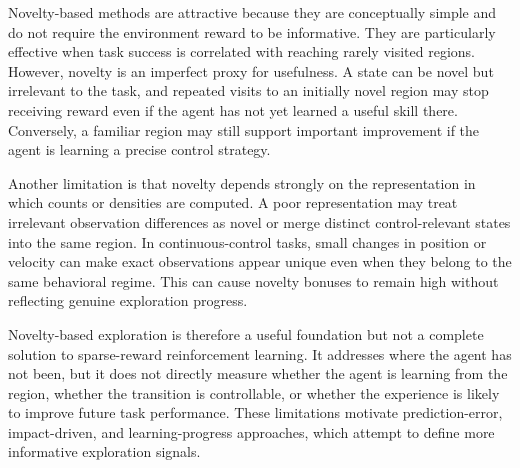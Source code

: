 Novelty-based methods are attractive because they are conceptually simple and do not require the environment reward to be informative.
They are particularly effective when task success is correlated with reaching rarely visited regions.
However, novelty is an imperfect proxy for usefulness.
A state can be novel but irrelevant to the task, and repeated visits to an initially novel region may stop receiving reward even if the agent has not yet learned a useful skill there.
Conversely, a familiar region may still support important improvement if the agent is learning a precise control strategy.

Another limitation is that novelty depends strongly on the representation in which counts or densities are computed.
A poor representation may treat irrelevant observation differences as novel or merge distinct control-relevant states into the same region.
In continuous-control tasks, small changes in position or velocity can make exact observations appear unique even when they belong to the same behavioral regime.
This can cause novelty bonuses to remain high without reflecting genuine exploration progress.

Novelty-based exploration is therefore a useful foundation but not a complete solution to sparse-reward reinforcement learning.
It addresses where the agent has not been, but it does not directly measure whether the agent is learning from the region, whether the transition is controllable, or whether the experience is likely to improve future task performance.
These limitations motivate prediction-error, impact-driven, and learning-progress approaches, which attempt to define more informative exploration signals.
